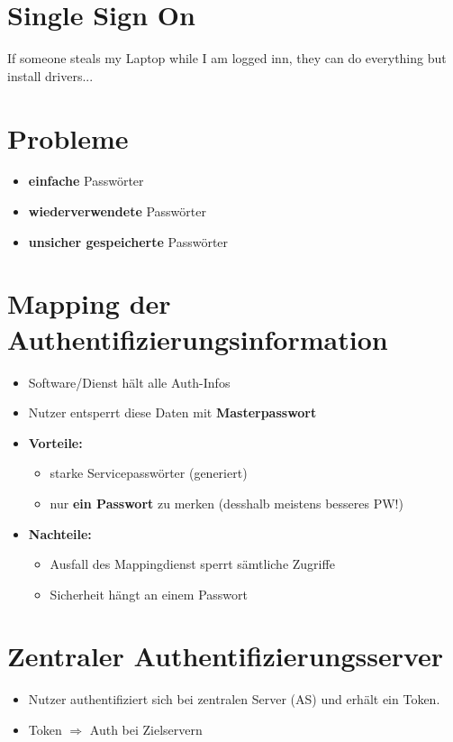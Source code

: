 \section{Single Sign On}
If someone steals my Laptop while I am logged inn, they can do everything but install drivers... 

\section{Probleme}
\begin{itemize}
	\item \textbf{einfache} Passwörter
	\item \textbf{wiederverwendete} Passwörter
	\item \textbf{unsicher gespeicherte} Passwörter
\end{itemize}

\section{Mapping der Authentifizierungsinformation}
\begin{itemize}
	\item Software/Dienst hält alle Auth-Infos
	\item Nutzer entsperrt diese Daten mit \textbf{Masterpasswort}
	\item \textbf{Vorteile:} 
	\begin{itemize}
		\item starke Servicepasswörter (generiert)
		\item nur \textbf{ein Passwort} zu merken (desshalb meistens besseres PW!) 
	\end{itemize}
	\item \textbf{Nachteile:}
	\begin{itemize}
		\item Ausfall des Mappingdienst sperrt sämtliche Zugriffe
		\item Sicherheit hängt an einem Passwort
	\end{itemize}
\end{itemize}

\section{Zentraler Authentifizierungsserver}
\begin{itemize}
	\item Nutzer authentifiziert sich bei zentralen Server (AS) und erhält ein Token.
	\item Token $\Rightarrow$ Auth bei Zielservern
\end{itemize}

